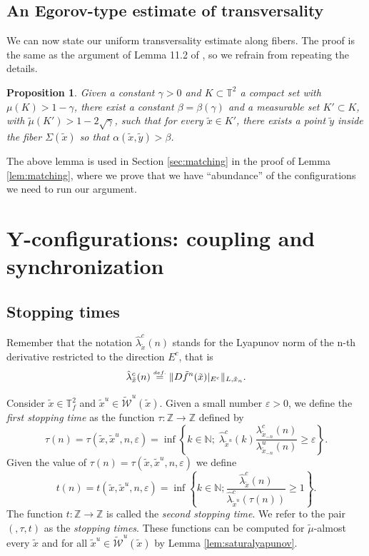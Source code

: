 \documentclass[a4paper,11pt,reqno]{amsart}
\newcommand{\Z}{{\mathbb Z}}
\newcommand{\N}{{\mathbb N}}
\newcommand{\TT}{{\mathbb{T}^2}}
\newcommand{\TTf}{{\mathbb{T}_f^2}}
\newcommand{\cW}{{\mathcal W}}
\newcommand{\eqdef}{\stackrel{\scriptscriptstyle\textrm def.}{=}}
\newcommand{\tix}{\tilde{x}}
\newcommand{\tif}{\tilde{f}}
\newcommand{\tm}{\tilde{\mu}}
\newcommand{\w}{\widetilde{\cW}}
\newtheorem{proposition}{Proposition}
\theoremstyle{definition}
\begin{document}
\subsection{An Egorov-type estimate of transversality}
We can now state our uniform transversality estimate along fibers. The proof is the same as the argument of Lemma 11.2 of \cite{ALOS}, so we refrain from repeating the details. 

\begin{proposition}
\label{prop:transversalidade}
Given a constant $\gamma>0$ and $K\subset\TT$ a compact set with $\mu(K)>1-\gamma$, there exist a constant $\beta=\beta(\gamma)$ and a measurable set $K'\subset K$, with $\tm(K')>1-2\sqrt{\gamma}$, such that for every $\tix\in K'$, there exists a point $\tilde{y}$ inside the fiber $\Sigma(\tix)$ so that $\alpha(\tix,\tilde{y})>\beta$. 
\end{proposition}

The above lemma is used in Section \ref{sec:matching} in the proof of Lemma \ref{lem:matching}, where we prove that we have ``abundance'' of the configurations we need to run our argument.

\section{Y-configurations: coupling and synchronization}
\label{sec:proof-main-lemma}


\subsection{Stopping times}
\label{sec:stopping-times}

Remember that the notation $\hat{\lambda}^c_{\tilde{x}}(n)$ stands for the Lyapunov norm of the n-th derivative restricted to the direction $E^c$, that is
$$\hat{\lambda}^c_{\tilde{x}}(n) \eqdef \Vert D\tif^n(\tix)|_{E^c} \Vert_{L,\tix_n}.$$

Consider $\tix \in \TTf$ and $\tix^u \in \w^u(\tix)$. Given a small number $\varepsilon>0$, we define the \emph{first stopping time} as the function $\tau:\Z\to\Z$ defined by
\begin{equation}
	\label{eq:tau}
 \tau(n)=\tau(\tix,\tix^u,n,\varepsilon) = \inf \left\{ k\in\N; \; \hat{\lambda}^c_{\tix^u}(k) \frac{\lambda^c_{\tix_{-n}}(n)}{\lambda^u_{\tix_{-n}}(n)} \geq \varepsilon \right\}. 	
\end{equation}
Given the value of $\tau(n)=\tau(\tix,\tix^u,n,\varepsilon)$ we define
\begin{equation}
    \label{eq:t}
t(n)=t(\tix,\tix^u,n,\varepsilon)=\inf \left\{k\in\N;\frac{\hat{\lambda}^c_{\tix}(n)}{\hat{\lambda}^c_{\tix^u}(\tau(n))} \geq 1 \right\}.    
\end{equation}
The function $t:\Z\to\Z$ is called the \emph{second stopping time}. We refer to the pair $(,\tau,t)$ as the \emph{stopping times}. These functions can be computed for $\tilde{\mu}$-almost every $\tix$ and for all $\tix^u \in \w^u(\tix)$ by Lemma \ref{lem:saturalyapunov}.
\end{document}
